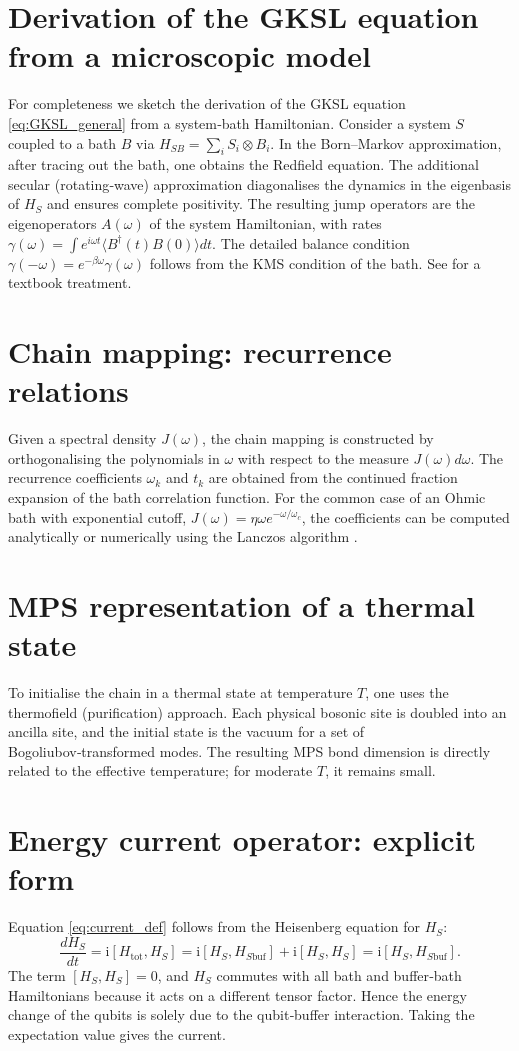 \documentclass[11pt,a4paper]{article}
\theoremstyle{definition}
\theoremstyle{remark}
\newcommand{\ii}{\mathrm{i}}
\begin{document}
\begin{appendices}
\section{Derivation of the GKSL equation from a microscopic model}
For completeness we sketch the derivation of the GKSL equation \eqref{eq:GKSL_general} from a system‑bath Hamiltonian. Consider a system $S$ coupled to a bath $B$ via $H_{SB}= \sum_i S_i\otimes B_i$. In the Born–Markov approximation, after tracing out the bath, one obtains the Redfield equation. The additional secular (rotating‑wave) approximation diagonalises the dynamics in the eigenbasis of $H_S$ and ensures complete positivity. The resulting jump operators are the eigenoperators $A(\omega)$ of the system Hamiltonian, with rates $\gamma(\omega)= \int e^{i\omega t}\langle B^\dagger(t)B(0)\rangle dt$. The detailed balance condition $\gamma(-\omega)=e^{-\beta\omega}\gamma(\omega)$ follows from the KMS condition of the bath. See \cite{Breuer2002} for a textbook treatment.

\section{Chain mapping: recurrence relations}
Given a spectral density $J(\omega)$, the chain mapping is constructed by orthogonalising the polynomials in $\omega$ with respect to the measure $J(\omega)d\omega$. The recurrence coefficients $\omega_k$ and $t_k$ are obtained from the continued fraction expansion of the bath correlation function. For the common case of an Ohmic bath with exponential cutoff, $J(\omega)= \eta\omega e^{-\omega/\omega_c}$, the coefficients can be computed analytically or numerically using the Lanczos algorithm \cite{Chin2010}.

\section{MPS representation of a thermal state}
To initialise the chain in a thermal state at temperature $T$, one uses the thermofield (purification) approach. Each physical bosonic site is doubled into an ancilla site, and the initial state is the vacuum for a set of Bogoliubov‑transformed modes. The resulting MPS bond dimension is directly related to the effective temperature; for moderate $T$, it remains small.

\section{Energy current operator: explicit form}
Equation \eqref{eq:current_def} follows from the Heisenberg equation for $H_S$:
\begin{equation}
\frac{d H_S}{dt} = \ii[ H_{\text{tot}}, H_S ] = \ii[ H_S, H_{S\text{buf}} ] + \ii[ H_S, H_S ] = \ii[ H_S, H_{S\text{buf}} ].
\end{equation}
The term $[H_S, H_S]=0$, and $H_S$ commutes with all bath and buffer‑bath Hamiltonians because it acts on a different tensor factor. Hence the energy change of the qubits is solely due to the qubit‑buffer interaction. Taking the expectation value gives the current.
\end{appendices}
\end{document}
